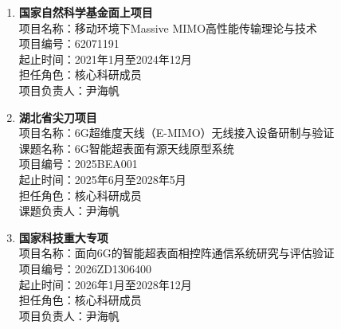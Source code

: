 \begin{project}
\renewcommand{\labelenumi}{\textbf{\arabic{enumi}.}}
\begin{enumerate}
	\item \textbf{国家自然科学基金面上项目}\\  
	项目名称：移动环境下Massive MIMO高性能传输理论与技术 \\
    项目编号：62071191 \\
    起止时间：2021年1月至2024年12月 \\
    担任角色：核心科研成员 \\
    项目负责人：尹海帆
    
	\item \textbf{湖北省尖刀项目}\\  
    项目名称：6G超维度天线（E-MIMO）无线接入设备研制与验证 \\
    课题名称：6G智能超表面有源天线原型系统 \\
    项目编号：2025BEA001 \\
    起止时间：2025年6月至2028年5月 \\
    担任角色：核心科研成员 \\
    课题负责人：尹海帆
    
    \item \textbf{国家科技重大专项}\\  
    项目名称：面向6G的智能超表面相控阵通信系统研究与评估验证 \\
    项目编号：2026ZD1306400 \\
    起止时间：2026年1月至2028年12月 \\
    担任角色：核心科研成员 \\
    项目负责人：尹海帆
\end{enumerate}
\end{project}